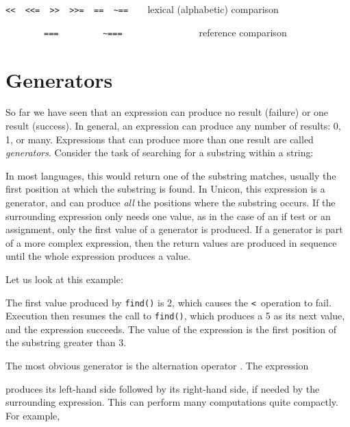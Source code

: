 \texttt{{\textless}{\textless} \ {\textless}{\textless}=
\ {\textgreater}{\textgreater} \ {\textgreater}{\textgreater}= \ ==
\ \~{}==\ \ }\ \ lexical (alphabetic)
comparison

\ \ \ \ \ \ \ \ \texttt{=== \ \ \ \ \ \ \ \ \~{}===}\ \ \ \ \ \ \ \ \ \ \ \ \ \ \ \ reference comparison

\section[Generators]{Generators}

So far we have seen that an expression can produce no result (failure)
or one result (success). In general, an expression can produce any
number of results: 0, 1, or many. Expressions that can produce more
than one result are called \textit{generators}.
Consider the task of searching for a substring within a string:


In most languages, this would return one of the substring matches,
usually the first position at which the substring is found. In Unicon,
this expression is a generator, and can produce \textit{all} the
positions where the substring occurs. If the surrounding expression
only needs one value, as in the case of an if test or an assignment,
only the first value of a generator is produced. If a generator is part
of a more complex expression, then the return values are produced in
sequence until the whole expression produces a value.

Let us look at this example:


The first value produced by \texttt{find()} is 2, which
causes the \texttt{{\textless}}\texttt{ }operation to fail. Execution
then resumes the call to \texttt{find()}, which produces a 5 as its
next value, and the expression succeeds. The value of the expression is
the first position of the substring greater than 3.

The most obvious generator is the alternation operator \texttt{{\textbar}}. The expression


\noindent
produces its left-hand side followed by its right-hand side, if needed
by the surrounding expression. This can perform many computations quite
compactly. For example,

